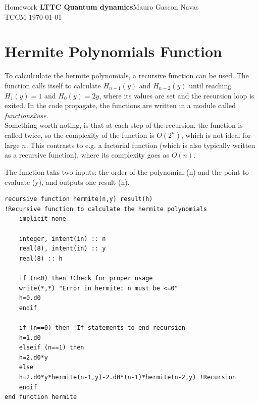 \documentclass{cis320}
\begin{document}
\noindent Homework \textbf{LTTC Quantum dynamics}\hfill  Mauro Gascon Navas\\
TCCM \today

\hrulefill

\section{Hermite Polynomials Function}

To calculculate the hermite polynomials, a recursive function can be used. The function calls itself to calculate $H_{n-1}(y)$ and $H_{n-2}(y)$ until reaching $H_1(y)=1$ and $H_0(y)=2y$, where its values are set and the recursion loop is exited. In the code propagate, the functions are written in a module called \textit{functions2use}.\\
Something worth noting, is that at each step of the recursion, the function is called twice, so the complexity of the function is $O(2^n)$, which is not ideal for large $n$. This contrasts to e.g. a factorial function (which is also typically written as a recursive function), where its complexity goes as $O(n)$.\\
\par 
The function taks two inputs: the order of the polynomial (n) and the point to evaluate (y), and outputs one result (h).
    \begin{lstlisting}[caption=Recursive function to calculate hermite polynomials]
recursive function hermite(n,y) result(h) 
!Recursive function to calculate the hermite polynomials
    implicit none

    integer, intent(in) :: n
    real(8), intent(in) :: y
    real(8) :: h

    if (n<0) then !Check for proper usage
    write(*,*) "Error in hermite: n must be <=0"
    h=0.d0
    endif

    if (n==0) then !If statements to end recursion
    h=1.d0
    elseif (n==1) then
    h=2.d0*y
    else
    h=2.d0*y*hermite(n-1,y)-2.d0*(n-1)*hermite(n-2,y) !Recursion
    endif
end function hermite \end{lstlisting}
\end{document}
